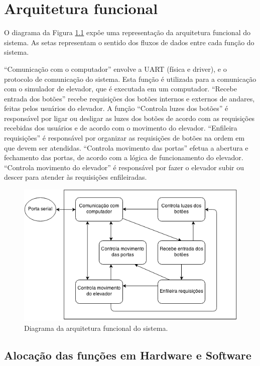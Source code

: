 \chapter{Arquitetura funcional}

O diagrama da Figura \ref{fig:arq_funcional} expôe uma representação da arquitetura funcional do sistema. As setas representam o sentido dos fluxos de dados entre cada função do sistema. 

``Comunicação com o computador'' envolve a UART (física e driver), e o protocolo de comunicação do sistema. Esta função é utilizada para a comunicação com o simulador de elevador, que é executada em um computador. ``Recebe entrada dos botões'' recebe requisições dos botões internos e externos de andares, feitas pelos usuários do elevador. A função ``Controla luzes dos botões'' é responsável por ligar ou desligar as luzes dos botões de acordo com as requisições recebidas dos usuários e de acordo com o movimento do elevador. ``Enfileira requisições'' é responsável por organizar as requisições de botões na ordem em que devem ser atendidas. ``Controla movimento das portas'' efetua a abertura e fechamento das portas, de acordo com a lógica de funcionamento do elevador. ``Controla movimento do elevador'' é responsável por fazer o elevador subir ou descer para atender às requisições enfileiradas.

\begin{figure}[h]
    \centering
    \includegraphics[width=0.8\columnwidth]{./figures/arq_funcional.png}
    \caption{Diagrama da arquitetura funcional do sistema.}
    \label{fig:arq_funcional}
\end{figure}

\section{Alocação das funções em Hardware e Software}

